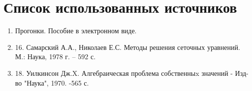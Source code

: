 \section{Список использованных источников}
\begin{enumerate}
  \item Прогонки. Пособие в электронном виде.
  \item 16.	Самарский А.А., Николаев Е.С. Методы решения сеточных уравнений. М.: Наука, 1978 г. – 592 с.
  \item 18.	Уилкинсон Дж.X. Алгебраическая проблема собственныx значений - Изд-во "Наука", 1970. -565 с.
\end{enumerate}